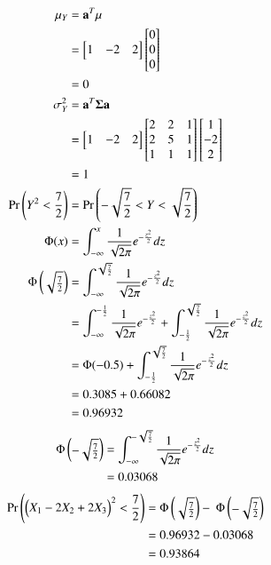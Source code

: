 \documentclass[journal,12pt,twocolumn]{IEEEtran}
\begin{document}
\begin{align}
\mu_Y &= \mathbf{a}^T \mathbf{\mu}  \\
&= \begin{bmatrix} 1 & -2 & 2 \end{bmatrix} \begin{bmatrix} 0 \\ 0 \\ 0 \end{bmatrix}  \\
&= 0 \\
\sigma_Y^2 &= \mathbf{a}^T \mathbf{\Sigma} \mathbf{a} \\
&= \begin{bmatrix} 1 & -2 & 2 \end{bmatrix} \begin{bmatrix} 2 & 2 & 1 \\ 2 & 5 & 1 \\ 1 & 1 & 1 \end{bmatrix} \begin{bmatrix} 1 \\ -2 \\ 2 \end{bmatrix} \\
&= 1 \\ 
\Pr\left(Y^2 < \frac{7}{2}\right) &= \Pr\left(-\sqrt{\frac{7}{2}} < Y < \sqrt{\frac{7}{2}}\right)\\
\Phi(x) &= \int_{-\infty}^{x} \frac{1}{\sqrt{2\pi}}e^{-\frac{z^2}{2}} dz \\
\Phi\begin{pmatrix}\sqrt{\frac{7}{2}}\end{pmatrix} &= \int_{-\infty}^{\sqrt{\frac{7}{2}}} \frac{1}{\sqrt{2\pi}}e^{-\frac{z^2}{2}} dz \\
&=\int_{-\infty}^{-\frac{1}{2}} \frac{1}{\sqrt{2\pi}}e^{-\frac{z^2}{2}} +\int_{-\frac{1}{2}}^{\sqrt{\frac{7}{2}}} \frac{1}{\sqrt{2\pi}}e^{-\frac{z^2}{2}} dz \\
&= \Phi(-0.5)+ \int_{-\frac{1}{2}}^{\sqrt{\frac{7}{2}}} \frac{1}{\sqrt{2\pi}}e^{-\frac{z^2}{2}} dz \\
&=0.3085+0.66082 \\
&=0.96932
\end{align}
\begin{align}
\Phi\begin{pmatrix}-\sqrt{\frac{7}{2}}\end{pmatrix} &= \int_{-\infty}^{-\sqrt{\frac{7}{2}}} \frac{1}{\sqrt{2\pi}}e^{-\frac{z^2}{2}} dz \\
&=0.03068
\end{align}
\begin{align}
\Pr\left(\begin{pmatrix}X_1 - 2X_2 + 2X_3\end{pmatrix}^2 < \frac{7}{2}\right)&= \Phi\begin{pmatrix}\sqrt{\frac{7}{2}}\end{pmatrix} - \ \Phi\begin{pmatrix}-\sqrt{\frac{7}{2}}\end{pmatrix} \\
&=0.96932-0.03068 \\
&=0.93864
\end{align}
\end{document}
